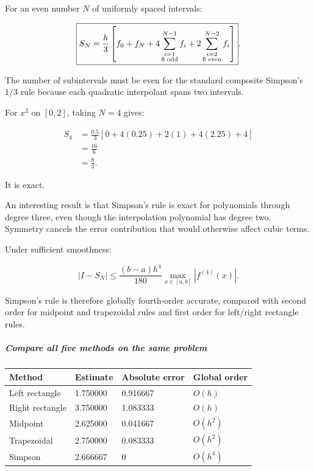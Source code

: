 For an even number \(N\) of uniformly spaced intervals:

\[
\boxed{ S_N= \frac h3 \left[ f_0+f_N+ 4\sum_{\substack{i=1\\\i\text{ odd}}}^{N-1}f_i+ 2\sum_{\substack{i=2\\\i\text{ even}}}^{N-2}f_i \right] }.
\]

The number of subintervals must be even for the standard composite Simpson's \(1/3\) rule because each quadratic interpolant spans two intervals.

For \(x^2\) on \([0,2]\), taking \(N=4\) gives:

\[
\begin{aligned} S_4 &=\frac{0.5}{3} [0+4(0.25)+2(1)+4(2.25)+4]\\ &=\frac{16}{6}\\ &=\boxed{\frac83}. \end{aligned}
\]

It is exact.

An interesting result is that Simpson's rule is exact for polynomials through degree three, even though the interpolation polynomial has degree two. Symmetry cancels the error contribution that would otherwise affect cubic terms.

Under sufficient smoothness:

\[
\boxed{ |I-S_N| \le \frac{(b-a)h^4}{180} \max_{x\in[a,b]}|f^{(4)}(x)| }.
\]

Simpson's rule is therefore globally fourth-order accurate, compared with second order for midpoint and trapezoidal rules and first order for left/right rectangle rules.

\subparagraph{Compare all five methods on the same problem}\label{compare-all-five-methods-on-the-same-problem}

{\def\LTcaptype{none} %
\begin{longtable}[]{@{}llll@{}}
\toprule\noalign{}
Method & Estimate & Absolute error & Global order \\
\midrule\noalign{}
\endhead
\bottomrule\noalign{}
\endlastfoot
Left rectangle & 1.750000 & 0.916667 & \(O(h)\) \\
Right rectangle & 3.750000 & 1.083333 & \(O(h)\) \\
Midpoint & 2.625000 & 0.041667 & \(O(h^2)\) \\
Trapezoidal & 2.750000 & 0.083333 & \(O(h^2)\) \\
Simpson & 2.666667 & 0 & \(O(h^4)\) \\
\end{longtable}
}

